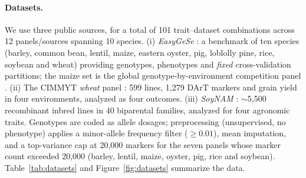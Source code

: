\documentclass[11pt]{article}
\newcommand{\NUM}[1]{#1} %
\theoremstyle{plain}
\theoremstyle{remark}
\begin{document}
\paragraph{Datasets.} We use three public sources, for a total of \NUM{101}
trait--dataset combinations across \NUM{12} panels/sources spanning 10 species. (i) \emph{EasyGeSe}
\citep{quesada2025easygese}: a benchmark of ten species (barley, common bean,
lentil, maize, eastern oyster, pig, loblolly pine, rice, soybean and wheat)
providing genotypes, phenotypes and \emph{fixed} cross-validation partitions; the
maize set is the global genotype-by-environment competition panel
\citep{washburn2025maize}. (ii) The CIMMYT \emph{wheat} panel
\citep{crossa2010}: 599 lines, 1{,}279 DArT markers and grain yield in four
environments, analyzed as four outcomes. (iii) \emph{SoyNAM}
\citep{xavier2016soynam}: $\sim$5{,}500 recombinant inbred lines in 40 biparental
families, analyzed for four agronomic traits. Genotypes are coded as allele
dosages; preprocessing (unsupervised, no phenotype) applies a minor-allele
frequency filter ($\geq 0.01$), mean imputation, and a top-variance cap at
20{,}000 markers for the seven panels whose marker count exceeded 20{,}000
(barley, lentil, maize, oyster, pig, rice and soybean).
Table~\ref{tab:datasets} and Figure~\ref{fig:datasets} summarize the data.
\end{document}
